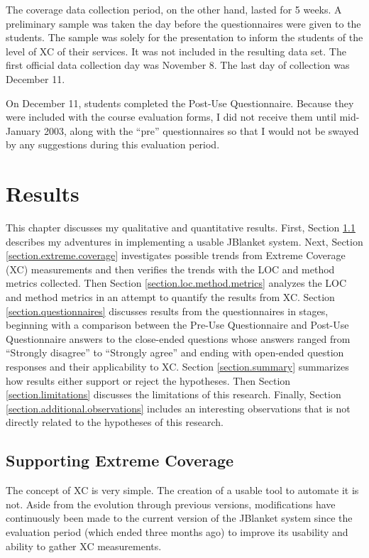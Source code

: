 The coverage data collection period, on the other hand, lasted for 5 weeks.
A preliminary sample was taken the day before the questionnaires were given
to the students.  The sample was solely for the presentation to inform the
students of the level of XC of their services.  It was not included in the
resulting data set.  The first official data collection day was November 8.
The last day of collection was December 11.

On December 11, students completed the Post-Use Questionnaire.  Because
they were included with the course evaluation forms, I did not receive them
until mid-January 2003, along with the ``pre'' questionnaires so that I
would not be swayed by any suggestions during this evaluation period.

\chapter{Results}
This chapter discusses my qualitative and quantitative results.  First,
Section \ref{section.support} describes my adventures in implementing a
usable JBlanket system.  Next, Section \ref{section.extreme.coverage}
investigates possible trends from Extreme Coverage (XC) measurements and
then verifies the trends with the LOC and method metrics collected.  Then
Section \ref{section.loc.method.metrics} analyzes the LOC and method
metrics in an attempt to quantify the results from XC.  Section
\ref{section.questionnaires} discusses results from the questionnaires in
stages, beginning with a comparison between the Pre-Use Questionnaire and
Post-Use Questionnaire answers to the close-ended questions whose answers
ranged from ``Strongly disagree'' to ``Strongly agree'' and ending with
open-ended question responses and their applicability to XC.  Section
\ref{section.summary} summarizes how results either support or reject the
hypotheses.  Then Section \ref{section.limitations} discusses the
limitations of this research.  Finally, Section
\ref{section.additional.observations} includes an interesting observations
that is not directly related to the hypotheses of this research.

\section{Supporting Extreme Coverage} \label{section.support}
The concept of XC is very simple.  The creation of a usable tool to
automate it is not.  Aside from the evolution through previous versions,
modifications have continuously been made to the current version of the
JBlanket system since the evaluation period (which ended three months ago)
to improve its usability and ability to gather XC measurements.


